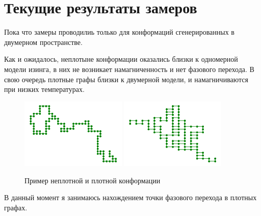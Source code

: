 \section{Текущие результаты замеров}
Пока что замеры проводилиь только для конформаций сгенерированных в двумерном пространстве.
 
Как и ожидалось, неплотыне конформации оказались близки к одномерной модели изинга, в них не возникает намагниченность и нет фазового перехода. В свою очередь плотные графы близки к двумерной модели, и намагничиваются при низких температурах.

\begin{figure}[h]
	\centering
	\includegraphics[width=0.45\textwidth]{../images/loose_conf.png}
	\includegraphics[width=0.45\textwidth]{../images/dense_conf.png} 
	\caption{Пример неплотной и плотной конформации}
\end{figure}

В данный момент я занимаюсь нахождением точки фазового перехода в плотных графах.